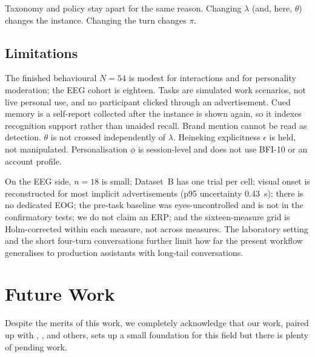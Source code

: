 \documentclass[english]{article}
\begin{document}
Taxonomy and policy stay apart for the same reason. Changing \(\lambda\) (and, here, \(\theta\)) changes the instance. Changing the turn changes \(\pi\).

\subsection{Limitations}

The finished behavioural \(N=54\) is modest for interactions and for personality moderation; the EEG cohort is eighteen. Tasks are simulated work scenarios, not live personal use, and no participant clicked through an advertisement. Cued memory is a self-report collected after the instance is shown again, so it indexes recognition support rather than unaided recall. Brand mention cannot be read as detection. \(\theta\) is not crossed independently of \(\lambda\). Heineking explicitness \(\epsilon\) is held, not manipulated. Personalisation \(\phi\) is session-level and does not use BFI-10 or an account profile.

On the EEG side, \(n=18\) is small; Dataset~B has one trial per cell; visual onset is reconstructed for most implicit advertisements (p95 uncertainty 0.43~s); there is no dedicated EOG; the pre-task baseline was eyes-uncontrolled and is not in the confirmatory tests; we do not claim an ERP; and the sixteen-measure grid is Holm-corrected within each measure, not across measures. The laboratory setting and the short four-turn conversations further limit how far the present workflow generalises to production assistants with long-tail conversations.

\section{Future Work}
\label{sec:future-work}

Despite the merits of this work, we completely acknowledge that our work, paired up with \cite{tang2025adstalkbackimplications}, \cite{xu2026ad}, \cite{meguellati2025llmads} and others, sets up a small foundation for this field but there is plenty of pending work.
\\
\end{document}
